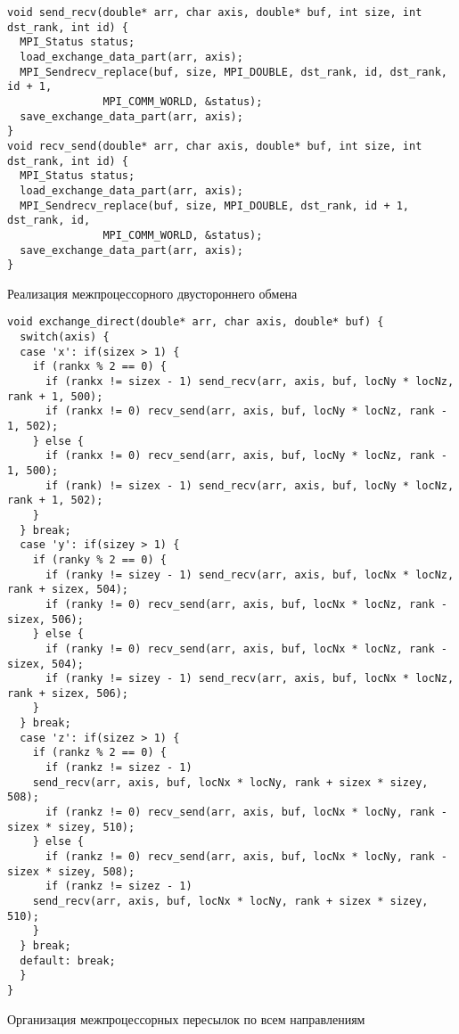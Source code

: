 \begin{listing}[!h]
\begin{verbatim}
void send_recv(double* arr, char axis, double* buf, int size, int dst_rank, int id) {
  MPI_Status status;
  load_exchange_data_part(arr, axis);
  MPI_Sendrecv_replace(buf, size, MPI_DOUBLE, dst_rank, id, dst_rank, id + 1,
		       MPI_COMM_WORLD, &status);
  save_exchange_data_part(arr, axis);
}
void recv_send(double* arr, char axis, double* buf, int size, int dst_rank, int id) {
  MPI_Status status;
  load_exchange_data_part(arr, axis);
  MPI_Sendrecv_replace(buf, size, MPI_DOUBLE, dst_rank, id + 1, dst_rank, id,
		       MPI_COMM_WORLD, &status);
  save_exchange_data_part(arr, axis);
}
\end{verbatim}
\caption{Реализация межпроцессорного двустороннего обмена}
\label{lst_exchange}
\end{listing}
\begin{listing}[!h]
\begin{verbatim}
void exchange_direct(double* arr, char axis, double* buf) {
  switch(axis) {
  case 'x': if(sizex > 1) {
    if (rankx % 2 == 0) {
      if (rankx != sizex - 1) send_recv(arr, axis, buf, locNy * locNz, rank + 1, 500);
      if (rankx != 0) recv_send(arr, axis, buf, locNy * locNz, rank - 1, 502);
    } else {
      if (rankx != 0) recv_send(arr, axis, buf, locNy * locNz, rank - 1, 500);
      if (rank) != sizex - 1) send_recv(arr, axis, buf, locNy * locNz, rank + 1, 502);
    }
  } break;
  case 'y': if(sizey > 1) {
    if (ranky % 2 == 0) {
      if (ranky != sizey - 1) send_recv(arr, axis, buf, locNx * locNz, rank + sizex, 504);
      if (ranky != 0) recv_send(arr, axis, buf, locNx * locNz, rank - sizex, 506);
    } else {
      if (ranky != 0) recv_send(arr, axis, buf, locNx * locNz, rank - sizex, 504);
      if (ranky != sizey - 1) send_recv(arr, axis, buf, locNx * locNz, rank + sizex, 506);
    }
  } break;
  case 'z': if(sizez > 1) {
    if (rankz % 2 == 0) {
      if (rankz != sizez - 1)
	send_recv(arr, axis, buf, locNx * locNy, rank + sizex * sizey, 508);
      if (rankz != 0) recv_send(arr, axis, buf, locNx * locNy, rank - sizex * sizey, 510);
    } else {
      if (rankz != 0) recv_send(arr, axis, buf, locNx * locNy, rank - sizex * sizey, 508);
      if (rankz != sizez - 1)
	send_recv(arr, axis, buf, locNx * locNy, rank + sizex * sizey, 510);
    }
  } break;
  default: break;
  }
}
\end{verbatim}
\caption{Организация межпроцессорных пересылок по всем направлениям}
\label{lst_exchanges}
\end{listing}

